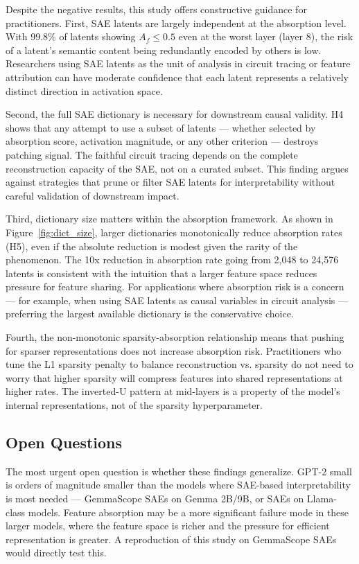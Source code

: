 \documentclass{article}
\begin{document}
Despite the negative results, this study offers constructive guidance for practitioners. First, SAE latents are largely independent at the absorption level. With 99.8\% of latents showing $A_f \leq 0.5$ even at the worst layer (layer 8), the risk of a latent's semantic content being redundantly encoded by others is low. Researchers using SAE latents as the unit of analysis in circuit tracing or feature attribution can have moderate confidence that each latent represents a relatively distinct direction in activation space.

Second, the full SAE dictionary is necessary for downstream causal validity. H4 shows that any attempt to use a subset of latents --- whether selected by absorption score, activation magnitude, or any other criterion --- destroys patching signal. The faithful circuit tracing depends on the complete reconstruction capacity of the SAE, not on a curated subset. This finding argues against strategies that prune or filter SAE latents for interpretability without careful validation of downstream impact.

Third, dictionary size matters within the absorption framework. As shown in Figure~\ref{fig:dict_size}, larger dictionaries monotonically reduce absorption rates (H5), even if the absolute reduction is modest given the rarity of the phenomenon. The 10x reduction in absorption rate going from 2,048 to 24,576 latents is consistent with the intuition that a larger feature space reduces pressure for feature sharing. For applications where absorption risk is a concern --- for example, when using SAE latents as causal variables in circuit analysis --- preferring the largest available dictionary is the conservative choice.

Fourth, the non-monotonic sparsity-absorption relationship means that pushing for sparser representations does not increase absorption risk. Practitioners who tune the L1 sparsity penalty to balance reconstruction vs. sparsity do not need to worry that higher sparsity will compress features into shared representations at higher rates. The inverted-U pattern at mid-layers is a property of the model's internal representations, not of the sparsity hyperparameter.

\subsection{Open Questions}
\label{sec:open_questions}

The most urgent open question is whether these findings generalize. GPT-2 small is orders of magnitude smaller than the models where SAE-based interpretability is most needed --- GemmaScope SAEs on Gemma 2B/9B, or SAEs on Llama-class models. Feature absorption may be a more significant failure mode in these larger models, where the feature space is richer and the pressure for efficient representation is greater. A reproduction of this study on GemmaScope SAEs would directly test this.
\end{document}
